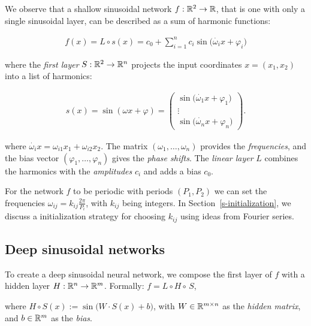 We observe that a shallow sinusoidal network $f:\mathbb{R}^2\to \mathbb{R}$, that is one with only a single sinusoidal layer, can be described as a sum of harmonic functions:

\begin{align}\label{e-fourier_series}
    f(x) = L\circ s(x) =  c_0 + \sum_{i=1}^{n} c_i  \sin\Big(\dot{\omega_i}{ x}+ \varphi_i\Big)
\end{align}

where the \textit{first layer} $S:\mathbb{R}^2\to \mathbb{R}^{n}$ projects the input coordinates $x=(x_1,x_2)$ into a list of harmonics:

\begin{align}\label{e-firstlayer}
\displaystyle
    s(x)=\sin(\omega x +\varphi)=
    \left(
    \begin{array}{c}
        \sin\big(\dot{\omega_1}{x}+\varphi_1\big)\\
         {\vdots}\\
         \sin\big(\dot{\omega_{n}}{x}+\varphi_{n}\big)
    \end{array}
    \right).
\end{align}

where $\dot{\omega_i}{x}=\omega_{i1}x_1+\omega_{i2}x_2$. The matrix $(\omega_1, \ldots, \omega_{n})$ provides the \textit{frequencies}, and the bias vector $(\varphi_1, \ldots, \varphi_{n})$ gives the \textit{phase shifts}. The \textit{linear layer} $L$ combines the harmonics with the \textit{amplitudes} $c_i$ and adds a bias $c_0$.

For the network $f$ to be periodic with periods $(P_1,P_2)$ we can set the frequencies $\omega_{ij}=k_{ij}\frac{2\pi}{P_i}$, with $k_{ij}$ being integers. In Section~\ref{s-initialization}, we discuss a initialization strategy for choosing $k_{ij}$ using ideas from Fourier series.

\subsection{Deep sinusoidal networks}\label{s-deep-networks}

To create a deep sinusoidal neural network, we compose the first layer of $f$ with a hidden layer $H:\mathbb{R}^{n}\to \mathbb{R}^{m}$. Formally:
$f=L\circ H \circ \,S$, 

where $H\circ S(x):=\sin\big(W \cdot S(x)+b\big)$, with $W\in\mathbb{R}^{m\times n}$ as the \textit{hidden matrix}, and $b\in\mathbb{R}^{m}$ as the \textit{bias}.


